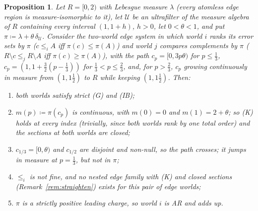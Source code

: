 \documentclass[11pt]{article}
\newtheorem{proposition}[theorem]{Proposition}
\theoremstyle{definition}
\theoremstyle{remark}
\begin{document}
\begin{proposition}\label{prop:B34}
Let $R=[0,2)$ with Lebesgue measure $\lambda$ (every atomless edge region is measure-isomorphic to it), let $\mathcal U$ be an ultrafilter of the measure algebra of $R$ containing every interval $(1,1+h)$, $h>0$, let $0<\theta<1$, and put $\pi\coloneqq\lambda+\theta\,\delta_{\mathcal U}$. Consider the two-world edge system in which world $i$ ranks its error sets by $\pi$ ($c\le_iA$ iff $\pi(c)\le\pi(A)$) and world $j$ compares complements by $\pi$ ($R\setminus c\le_jR\setminus A$ iff $\pi(c)\ge\pi(A)$), with the path $c_p=[0,3p\theta)$ for $p\le\tfrac13$, $c_p=(1,1+\tfrac32(p-\tfrac13))$ for $\tfrac13<p\le\tfrac23$, and, for $p>\tfrac23$, $c_p$ growing continuously in measure from $(1,1\tfrac12)$ to $R$ while keeping $(1,1\tfrac12)$. Then:
\begin{enumerate}[leftmargin=*,label=(\alph*)]
\item both worlds satisfy strict (G) and (IB);
\item $m(p)\coloneqq\pi(c_p)$ is continuous, with $m(0)=0$ and $m(1)=2+\theta$; so (K) holds at every index (trivially, since both worlds rank by one total order) and the sections at both worlds are closed;
\item $c_{1/3}=[0,\theta)$ and $c_{1/2}$ are disjoint and non-null, so the path crosses; it jumps in measure at $p=\tfrac13$, but not in $\pi$;
\item $\le_i$ is not fine, and no nested edge family with (K) and closed sections (Remark~\ref{rem:straighten}) exists for this pair of edge worlds;
\item $\pi$ is a strictly positive leading charge, so world $i$ is AR and adds up.
\end{enumerate}
\end{proposition}
\end{document}
